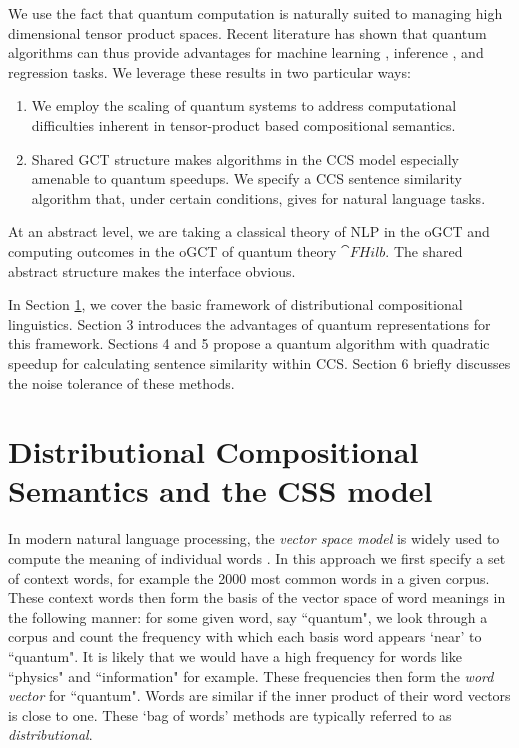 We use the fact that quantum computation is naturally suited to managing high dimensional tensor product spaces. Recent literature has shown that quantum algorithms can thus provide advantages for machine learning \cite{wiebe2014quantum,rebentrost2014quantum}, inference \cite{low2014quantum}, and regression \cite{wiebe2012quantum,wang2014quantum} tasks.  We leverage these results in two particular ways:
\begin{enumerate}
\item We employ the scaling of quantum systems to address computational difficulties  inherent in tensor-product based compositional semantics.
\item Shared GCT structure makes algorithms in the CCS model especially amenable to quantum speedups.  We specify a CCS sentence similarity algorithm that, under certain conditions, gives  for natural language tasks.
\end{enumerate}
At an abstract level, we are taking a classical theory of NLP in the oGCT  and computing outcomes in the oGCT of quantum theory $\cat{FHilb}$. The shared abstract structure makes the interface obvious.

In Section \ref{sec:disco}, we cover the basic framework of distributional compositional linguistics. Section 3 introduces the advantages of quantum representations for this framework.  Sections 4 and 5 propose a quantum algorithm with quadratic speedup for calculating sentence similarity within CCS. Section 6 briefly discusses the noise tolerance of these methods.

\section{Distributional Compositional Semantics and the CSS model}
\label{sec:disco}
In modern natural language processing, the \emph{vector space model} is widely used to compute the meaning of individual words \cite{schutze1998automatic}. In this approach we first specify a set of context words, for example the 2000 most common words in a given corpus.  These context words then form the basis of the vector space of word meanings in the following manner: for some given word, say  ``quantum", we look through a corpus and count the frequency with which each basis word    appears `near' to ``quantum". It is likely that we would have a high frequency for words like ``physics" and ``information" for example.  These frequencies then form the \emph{word vector} for ``quantum". Words are similar if the inner product of their word vectors is close to one. These `bag of words' methods are typically referred to as \emph{distributional}.

